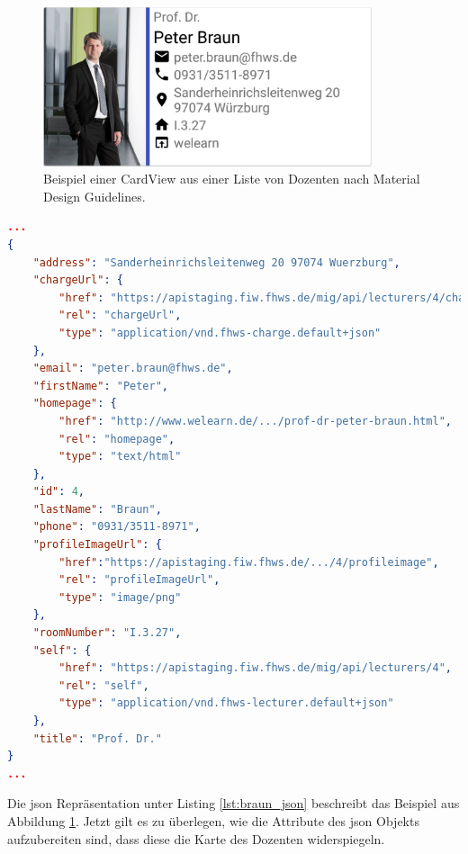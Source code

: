 \begin{figure}[H]
	\begin{center}
		\includegraphics[width=0.86\textwidth]{images/card.png}
		\caption{Beispiel einer CardView aus einer Liste von Dozenten nach Material Design Guidelines.}
		\label{fig:card}
	\end{center}
\end{figure}

\newpage

\begin{lstlisting}[label=lst:braun_json,
language=json,
firstnumber=1,
caption=Demo Daten eines Dozenten.]	
...			   
{
	"address": "Sanderheinrichsleitenweg 20 97074 Wuerzburg",
	"chargeUrl": {
		"href": "https://apistaging.fiw.fhws.de/mig/api/lecturers/4/charges",
		"rel": "chargeUrl",
		"type": "application/vnd.fhws-charge.default+json"
	},
	"email": "peter.braun@fhws.de",
	"firstName": "Peter",
	"homepage": {
		"href": "http://www.welearn.de/.../prof-dr-peter-braun.html",
		"rel": "homepage",
		"type": "text/html"
	},
	"id": 4,
	"lastName": "Braun",
	"phone": "0931/3511-8971",
	"profileImageUrl": {
		"href":"https://apistaging.fiw.fhws.de/.../4/profileimage",
		"rel": "profileImageUrl",
		"type": "image/png"
	},
	"roomNumber": "I.3.27",
	"self": {
		"href": "https://apistaging.fiw.fhws.de/mig/api/lecturers/4",
		"rel": "self",
		"type": "application/vnd.fhws-lecturer.default+json"
	},
	"title": "Prof. Dr."
}
...
\end{lstlisting}

Die  \acf{json} Repräsentation unter Listing \ref{lst:braun_json} beschreibt das Beispiel aus Abbildung \ref{fig:card}.
Jetzt gilt es zu überlegen, wie die Attribute des \ac{json} Objekts aufzubereiten sind, dass diese die Karte des Dozenten widerspiegeln. 

